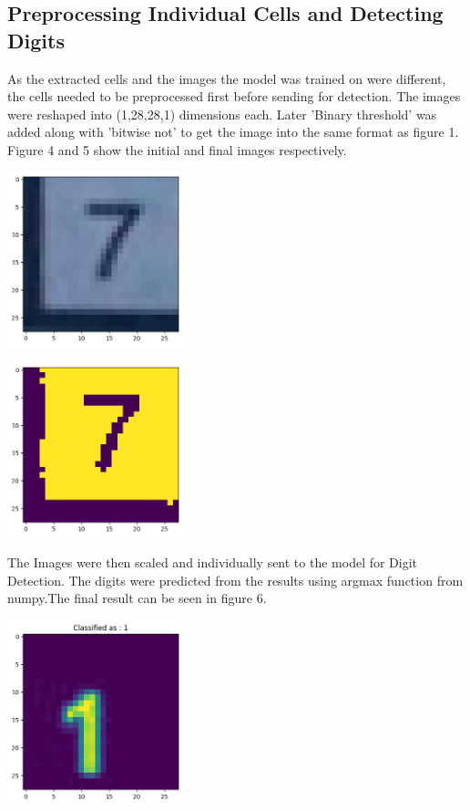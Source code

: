 \documentclass[a4paper,12pt]{article}
\begin{document}
\subsection{Preprocessing Individual Cells and Detecting Digits}
As the extracted cells and the images the model was trained on were different, the cells needed to be preprocessed first before sending for detection. The images were reshaped into (1,28,28,1) dimensions each. Later 'Binary threshold'\cite{opencv_thresholding} was added along with 'bitwise not'\cite{arithmetic_op} to get the image into the same format as figure 1. Figure 4 and 5 show the initial and final images respectively.
\begin{center}
        \includegraphics[width=2in]{c1.png}
        \label{fig:figure_label}
\end{center}
\begin{center}
        \includegraphics[width=2in]{c2.png}
        \label{fig:figure_label}
\end{center}
The Images were then scaled and individually sent to the model for Digit Detection. The digits were predicted from the results using argmax function from numpy\cite{tds_from_scratch}.The final result can be seen in figure 6.
\begin{center}
        \includegraphics[width=2in]{classified.png}
        \label{fig:figure_label}
\end{center}
\end{document}
